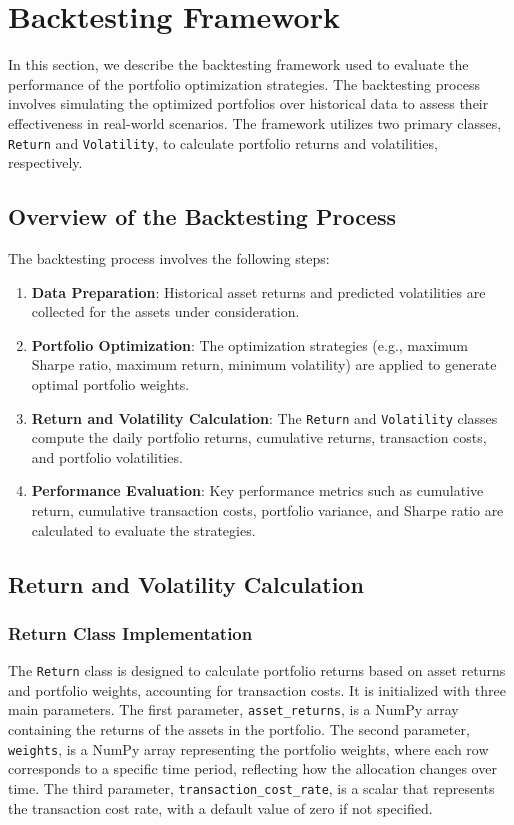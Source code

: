 \section{Backtesting Framework}

In this section, we describe the backtesting framework used to evaluate the performance of the portfolio optimization strategies. The backtesting process involves simulating the optimized portfolios over historical data to assess their effectiveness in real-world scenarios. The framework utilizes two primary classes, \texttt{Return} and \texttt{Volatility}, to calculate portfolio returns and volatilities, respectively.

\subsection{Overview of the Backtesting Process}

The backtesting process involves the following steps:

\begin{enumerate}
    \item \textbf{Data Preparation}: Historical asset returns and predicted volatilities are collected for the assets under consideration.
    \item \textbf{Portfolio Optimization}: The optimization strategies (e.g., maximum Sharpe ratio, maximum return, minimum volatility) are applied to generate optimal portfolio weights.
    \item \textbf{Return and Volatility Calculation}: The \texttt{Return} and \texttt{Volatility} classes compute the daily portfolio returns, cumulative returns, transaction costs, and portfolio volatilities.
    \item \textbf{Performance Evaluation}: Key performance metrics such as cumulative return, cumulative transaction costs, portfolio variance, and Sharpe ratio are calculated to evaluate the strategies.
\end{enumerate}

\subsection{Return and Volatility Calculation}

\subsubsection{Return Class Implementation}

The \texttt{Return} class is designed to calculate portfolio returns based on asset returns and portfolio weights, accounting for transaction costs. 
It is initialized with three main parameters. 
The first parameter, \texttt{asset\_returns}, is a NumPy array containing the returns of the assets in the portfolio. 
The second parameter, \texttt{weights}, is a NumPy array representing the portfolio weights, where each row corresponds to a specific time period, reflecting how the allocation changes over time. 
The third parameter, \texttt{transaction\_cost\_rate}, is a scalar that represents the transaction cost rate, with a default value of zero if not specified.

